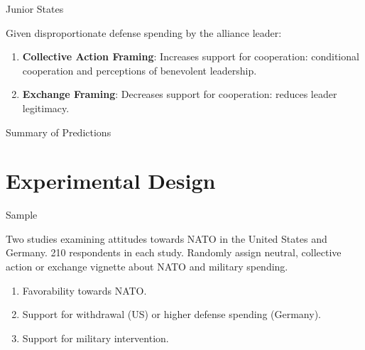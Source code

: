 \documentclass[12pt]{beamer}
\begin{document}

\begin{frame}{Junior States}

Given disproportionate defense spending by the alliance leader: 
\pause 
\begin{enumerate} 
\item \textbf{Collective Action Framing}: Increases support for cooperation: conditional cooperation and perceptions of benevolent leadership. 
\pause 
\item \textbf{Exchange Framing}: Decreases support for cooperation: reduces leader legitimacy. 
\end{enumerate}


\end{frame} 


\begin{frame}{Summary of Predictions}


\end{frame} 





\section{Experimental Design} 


\begin{frame}{Sample}

Two studies examining attitudes towards NATO in the United States and Germany. 210 respondents in each study. Randomly assign neutral, collective action or exchange vignette about NATO and military spending. 

\pause 
\begin{enumerate} 
\item Favorability towards NATO. 
\pause 
\item Support for withdrawal (US) or higher defense spending (Germany).  
\pause
\item Support for military intervention. 
\end{enumerate}


\end{frame} 
\end{document}

